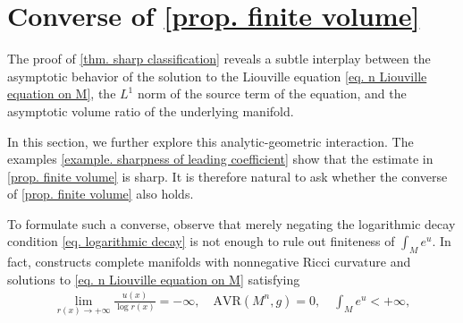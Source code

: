 \documentclass[12pt]{amsart}
\theoremstyle{plain}
\theoremstyle{definition}
\theoremstyle{remark}     %
\begin{document}
 \section{Converse of \cref{prop. finite volume}}\label{sec. discussion}
The proof of \cref{thm. sharp classification} reveals a subtle interplay between the asymptotic behavior of the solution to the Liouville equation \cref{eq. n Liouville equation on M}, the $L^1$ norm of the source term of the equation, and the asymptotic volume ratio of the underlying manifold.
 
 In this section, we further explore this analytic-geometric interaction.
 The examples \cref{example. sharpness of leading coefficient} show that
 the estimate in \cref{prop. finite volume} is sharp. It is therefore natural to ask whether the converse of \cref{prop. finite volume} also holds.
 
 To formulate such a converse, observe that merely negating the logarithmic decay condition \cref{eq. logarithmic decay} is not enough to rule out finiteness of $\int_M e^u$.
 In fact, 
 \cite[Example 4.7]{CMR26} constructs   complete manifolds with nonnegative Ricci curvature and  solutions to \cref{eq. n Liouville equation on M} satisfying
 \begin{align}\label{example vanishing AVR}
     \lim_{r(x)\to+\infty}\frac{u(x)}{\log r(x)}=-\infty,\quad 
     \mathrm{AVR}(M^n,g)=0,\quad 
     \int_M e^u<+\infty,
 \end{align}
 
\end{document}
